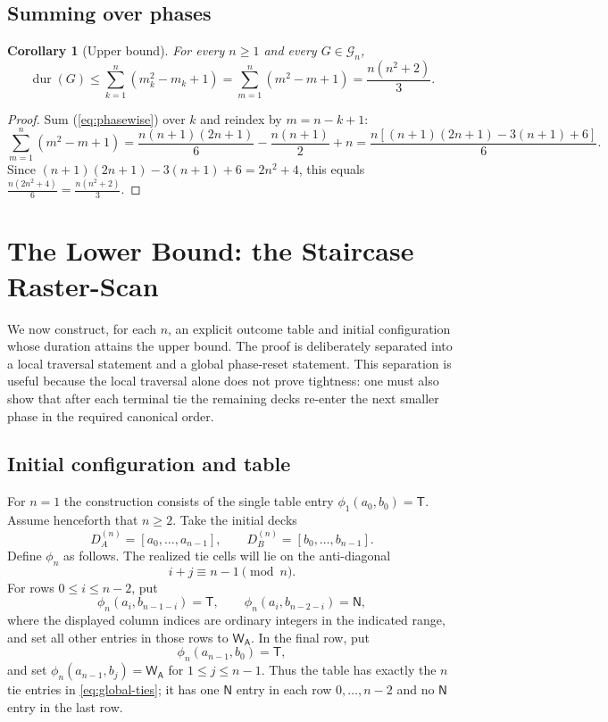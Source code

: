 \documentclass[11pt]{article}
\newtheorem{corollary}{Corollary}
\theoremstyle{definition}
\theoremstyle{remark}
\DeclareMathOperator{\dur}{dur}
\newcommand{\WA}{\mathsf{W_A}}
\newcommand{\TT}{\mathsf{T}}
\newcommand{\NN}{\mathsf{N}}
\begin{document}
\subsection{Summing over phases}
\begin{corollary}[Upper bound]\label{cor:upper}
For every $n\ge 1$ and every $G\in\mathcal{G}_n$,
\begin{equation}\label{eq:upper}
\dur(G) \le \sum_{k=1}^n (m_k^2-m_k+1) = \sum_{m=1}^n (m^2-m+1) = \frac{n(n^2+2)}{3}.
\end{equation}
\end{corollary}
\begin{proof}
Sum (\ref{eq:phasewise}) over $k$ and reindex by $m=n-k+1$:
\[
\sum_{m=1}^n (m^2-m+1) = \frac{n(n+1)(2n+1)}{6} - \frac{n(n+1)}{2} + n = \frac{n[(n+1)(2n+1)-3(n+1)+6]}{6}.
\]
Since $(n+1)(2n+1)-3(n+1)+6=2n^2+4$, this equals $\frac{n(2n^2+4)}{6}=\frac{n(n^2+2)}{3}$.
\end{proof}


\section{The Lower Bound: the Staircase Raster-Scan}\label{sec:lower}
We now construct, for each $n$, an explicit outcome table and initial configuration whose duration attains the upper bound. The proof is deliberately separated into a local traversal statement and a global phase-reset statement. This separation is useful because the local traversal alone does not prove tightness: one must also show that after each terminal tie the remaining decks re-enter the next smaller phase in the required canonical order.

\subsection{Initial configuration and table}
For $n=1$ the construction consists of the single table entry $\phi_1(a_0,b_0)=\TT$. Assume henceforth that $n\ge 2$. Take the initial decks
\[
D_A^{(n)}=[a_0,\dots,a_{n-1}],\qquad D_B^{(n)}=[b_0,\dots,b_{n-1}].
\]
Define $\phi_n$ as follows. The realized tie cells will lie on the anti-diagonal
\begin{equation}\label{eq:global-ties}
 i+j\equiv n-1 \pmod n.
\end{equation}
For rows $0\le i\le n-2$, put
\[
\phi_n(a_i,b_{n-1-i})=\TT,\qquad \phi_n(a_i,b_{n-2-i})=\NN,
\]
where the displayed column indices are ordinary integers in the indicated range, and set all other entries in those rows to $\WA$. In the final row, put
\[
\phi_n(a_{n-1},b_0)=\TT,
\]
and set $\phi_n(a_{n-1},b_j)=\WA$ for $1\le j\le n-1$. Thus the table has exactly the $n$ tie entries in \eqref{eq:global-ties}; it has one $\NN$ entry in each row $0,\dots,n-2$ and no $\NN$ entry in the last row.
\end{document}
